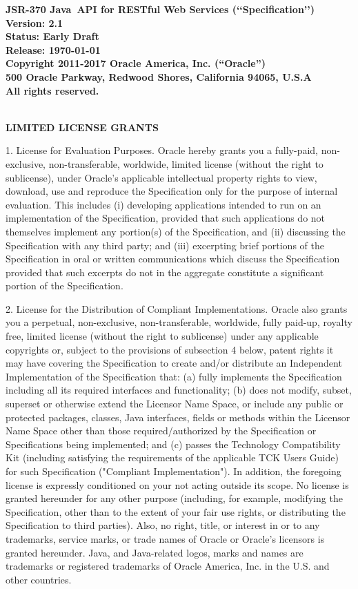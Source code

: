 \begin{flushleft}

{\bfseries JSR-370 Java\texttrademark\ API for RESTful Web Services (\lq\lq Specification\rq\rq)\\
Version: 2.1 \\
Status: Early Draft \\
Release: \today\\ 
Copyright 2011-2017 Oracle America, Inc. (``Oracle'') \\
500 Oracle Parkway, Redwood Shores, California 94065, U.S.A\\ 
All rights reserved.
}

\mbox{}\\
{\bfseries LIMITED LICENSE GRANTS}

1. License for Evaluation Purposes. Oracle hereby grants you a fully-paid, non-exclusive, non-transferable, worldwide, limited license (without the right to sublicense), under Oracle's  applicable intellectual property rights to view, download, use and reproduce the Specification only for the purpose of internal evaluation.  This includes (i) developing applications intended to run on an implementation of the Specification, provided that such applications do not themselves implement any portion(s) of the Specification, and (ii) discussing the Specification with any third party; and (iii) excerpting brief portions of the Specification in oral or written communications which discuss the Specification provided that such excerpts do not in the aggregate constitute a significant portion of the Specification.

2. License for the Distribution of Compliant Implementations. Oracle  also grants you a perpetual, non-exclusive, non-transferable, worldwide, fully paid-up, royalty free, limited license (without the right to sublicense) under any applicable copyrights or, subject to the provisions of subsection 4 below, patent rights it may have covering the Specification to create and/or distribute an Independent Implementation of the Specification that: (a) fully implements the Specification including all its required interfaces and functionality; (b) does not modify, subset, superset or otherwise extend the Licensor Name Space, or include any public or protected packages, classes, Java interfaces, fields or methods within the Licensor Name Space other than those required/authorized by the Specification or Specifications being implemented; and (c) passes the Technology Compatibility Kit (including satisfying the requirements of the applicable TCK Users Guide) for such Specification ("Compliant Implementation").  In addition, the foregoing license is expressly conditioned on your not acting outside its scope.  No license is granted hereunder for any other purpose (including, for example, modifying the Specification, other than to the extent of your fair use rights, or distributing the Specification to third parties).  Also, no right, title, or interest in or to any trademarks, service marks, or trade names of Oracle or Oracle's licensors is granted hereunder.  Java, and Java-related logos, marks and names are trademarks or registered trademarks of Oracle America, Inc. in the U.S. and other countries.


\end{flushleft}
